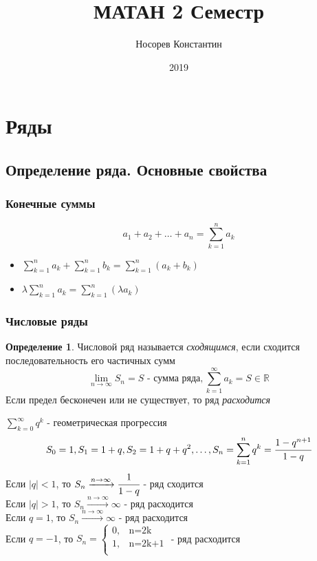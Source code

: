 \documentclass[a4paper]{article}
\title{ МАТАН 2 Семестр}
\author{Носорев Константин}
\date{2019\\}
\theoremstyle{definition}
\newtheorem{definition}{Определение}
\newcommand\abs[1]{%
\mbox{$| #1 |$}}
\numberwithin{theorem}{subsection}
\numberwithin{lemma}{subsection}
\numberwithin{definition}{subsection}
\numberwithin{comment*}{subsection}
\numberwithin{consequence}{subsection}
\numberwithin{property}{subsection}
\begin{document}
\maketitle
\tableofcontents
\section{Ряды}
\subsection{Определение ряда. Основные свойства}
\setcounter{subsubsection}{-1}

\subsubsection{Конечные суммы}
$$a_1+a_2+\dots+a_n = \sum_{k=1}^{n} a_k$$
\begin{itemize}
 \item $\sum_{k=1}^{n}{a_k} + \sum_{k=1}^{n}{b_k} = \sum_{k=1}^{n}{(a_k+b_k)}$
 \item $\lambda \sum_{k=1}^{n}{a_k} = \sum_{k=1}^{n}{(\lambda a_k)}$
\end{itemize}
\subsubsection{Числовые ряды}
\begin{definition}
 Числовой ряд называется \textit{сходящимся}, если сходится последовательность его частичных сумм
 $$\lim_{n\rightarrow \infty}{S_n}=S \text{ - сумма ряда}, \sum_{k=1}^{\infty}{a_k} = S \in \mathbb{R} $$
 Если предел бесконечен или не существует, то ряд \textit{расходится}
\end{definition}
\exmp $\sum_{k=0}^{\infty}{q^k} \text{ - геометрическая прогрессия }$
$$S_0 = 1, S_1 = 1+q, S_2= 1 + q +q^2, \dots , S_n = \sum_{k=1}^{n}{q^k} = \cfrac{1-q^{n+1}}{1-q}$$
Если $\abs{q} < 1$, то $S_n \xrightarrow{n\rightarrow \infty} \cfrac{1}{1-q}$ - ряд сходится\\
Если $\abs{q} > 1$, то $S_n \xrightarrow{n\rightarrow \infty} \infty$ - ряд расходится\\
Если $q = 1$, то $S_n \xrightarrow{n\rightarrow \infty} \infty$ - ряд расходится\\
Если $q = -1$, то $S_n = \begin{cases}
  0, & \text{n=2k}   \\
  1, & \text{n=2k+1} \\
 \end{cases}$ - ряд расходится
\end{document}
